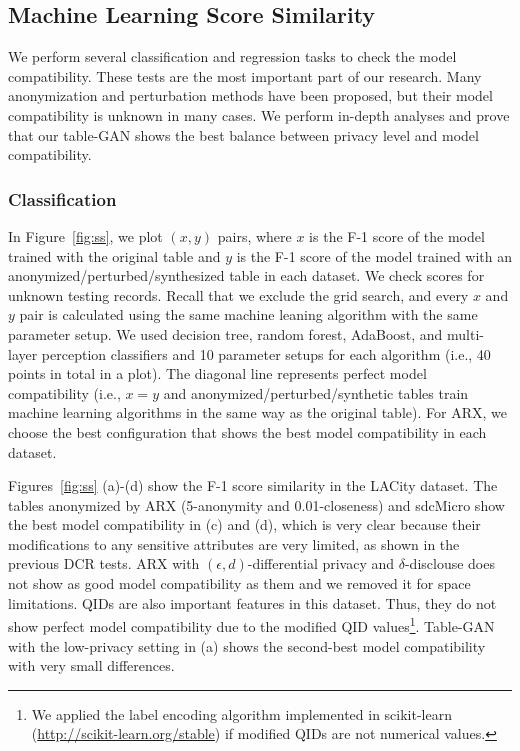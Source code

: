\subsection{Machine Learning Score Similarity}\label{sec:clas}
We perform several classification and regression tasks to check the model compatibility. These tests are the most important part of our research.  Many anonymization and perturbation methods have been proposed, but their model compatibility is unknown in many cases. We perform in-depth analyses and prove that our table-GAN shows the best balance between privacy level and model compatibility.

\subsubsection{Classification}

In Figure~\ref{fig:ss}, we plot $(x,y)$ pairs, where $x$ is the F-1 score of the model trained with the original table and $y$ is the F-1 score of the model trained with an anonymized\slash perturbed\slash synthesized table in each dataset. We check scores for unknown testing records. Recall that we exclude the grid search, and every $x$ and $y$ pair is calculated using the same machine leaning algorithm with the same parameter setup. We used decision tree, random forest, AdaBoost, and multi-layer perception classifiers and 10 parameter setups for each algorithm (i.e., 40 points in total in a plot). The diagonal line represents perfect model compatibility (i.e., $x=y$ and anonymized\slash perturbed\slash synthetic tables train machine learning algorithms in the same way as the original table). For ARX, we choose the best configuration that shows the best model compatibility in each dataset.

Figures~\ref{fig:ss} (a)-(d) show the F-1 score similarity in the LACity dataset. The tables anonymized by ARX (5-anonymity and 0.01-closeness) and sdcMicro show the best model compatibility in (c) and (d), which is very clear because their modifications to any sensitive attributes are very limited, as shown in the previous DCR tests. ARX with $(\epsilon,d)$-differential privacy and $\delta$-disclouse does not show as good model compatibility as them and we removed it for space limitations. QIDs are also important features in this dataset. Thus, they do not show perfect model compatibility due to the modified QID values\footnote{We applied the label encoding algorithm implemented in scikit-learn (\url{http://scikit-learn.org/stable}) if modified QIDs are not numerical values.}. Table-GAN with the low-privacy setting in (a) shows the second-best model compatibility with very small differences.

